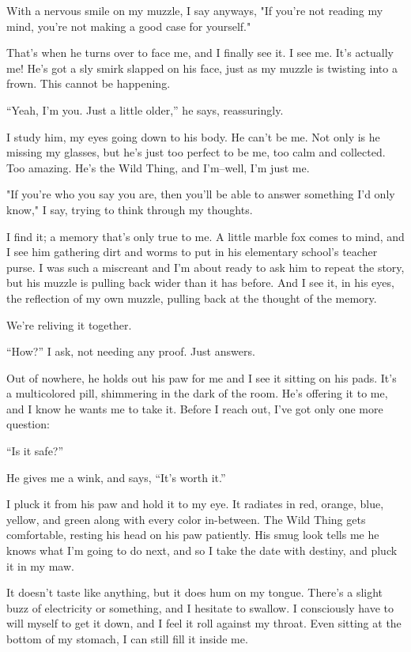 With a nervous smile on my muzzle, I say anyways, "If you're not reading
my mind, you're not making a good case for yourself."

That's when he turns over to face me, and I finally see it. I see me.
It's actually me! He's got a sly smirk slapped on his face, just as my
muzzle is twisting into a frown. This cannot be happening.

``Yeah, I'm you. Just a little older,'' he says, reassuringly.

I study him, my eyes going down to his body. He can't be me. Not only is
he missing my glasses, but he's just too perfect to be me, too calm and
collected. Too amazing. He's the Wild Thing, and I'm--well, I'm just
me.

"If you're who you say you are, then you'll be able to answer something
I'd only know," I say, trying to think through my thoughts.

I find it; a memory that's only true to me. A little marble fox comes to
mind, and I see him gathering dirt and worms to put in his elementary
school's teacher purse. I was such a miscreant and I'm about ready to
ask him to repeat the story, but his muzzle is pulling back wider than
it has before. And I see it, in his eyes, the reflection of my own
muzzle, pulling back at the thought of the memory.

We're reliving it together.

``How?'' I ask, not needing any proof. Just answers.

Out of nowhere, he holds out his paw for me and I see it sitting on his
pads. It's a multicolored pill, shimmering in the dark of the room. He's
offering it to me, and I know he wants me to take it. Before I reach
out, I've got only one more question:

``Is it safe?''

He gives me a wink, and says, ``It's worth it.''

I pluck it from his paw and hold it to my eye. It radiates in red,
orange, blue, yellow, and green along with every color in-between. The
Wild Thing gets comfortable, resting his head on his paw patiently. His
smug look tells me he knows what I'm going to do next, and so I take the
date with destiny, and pluck it in my maw.

It doesn't taste like anything, but it does hum on my tongue. There's a
slight buzz of electricity or something, and I hesitate to swallow. I
consciously have to will myself to get it down, and I feel it roll
against my throat. Even sitting at the bottom of my stomach, I can still
fill it inside me.

